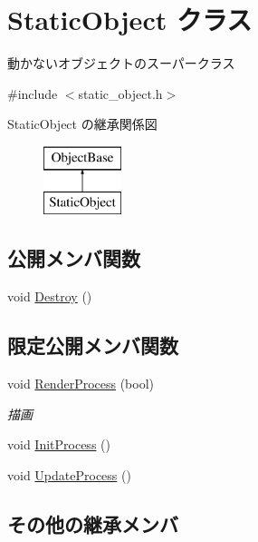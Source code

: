 \hypertarget{class_static_object}{}\section{Static\+Object クラス}
\label{class_static_object}


動かないオブジェクトのスーパークラス  




{\ttfamily \#include $<$static\+\_\+object.\+h$>$}

Static\+Object の継承関係図\begin{figure}[H]
\begin{center}
\leavevmode
\includegraphics[height=2.000000cm]{class_static_object}
\end{center}
\end{figure}
\subsection*{公開メンバ関数}
\begin{DoxyCompactItemize}
\item 
void \mbox{\hyperlink{class_static_object_aac4b963c88ebffb128bcaf5abf09768b}{Destroy}} ()
\end{DoxyCompactItemize}
\subsection*{限定公開メンバ関数}
\begin{DoxyCompactItemize}
\item 
void \mbox{\hyperlink{class_static_object_afec57009537695c4715386120a619942}{Render\+Process}} (bool)
\begin{DoxyCompactList}\small\item\em 描画 \end{DoxyCompactList}\item 
void \mbox{\hyperlink{class_static_object_ae9563da84f7045d6206c938963d5aecf}{Init\+Process}} ()
\item 
void \mbox{\hyperlink{class_static_object_a0dd0ec514aa597a1dd83a1168902a079}{Update\+Process}} ()
\end{DoxyCompactItemize}
\subsection*{その他の継承メンバ}


